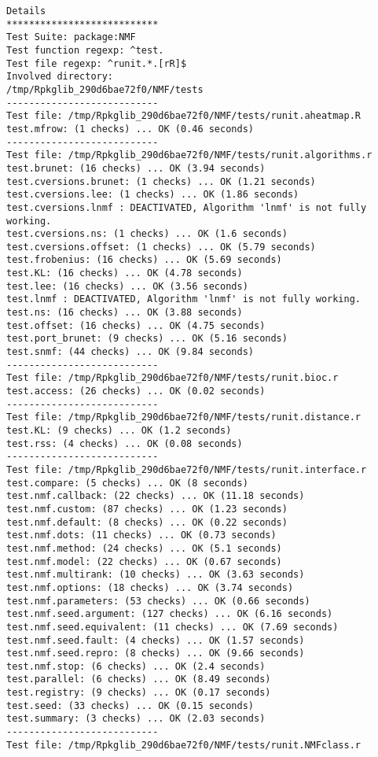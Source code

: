 \documentclass[10pt]{article}
\begin{document}
\begin{verbatim}
Details 
*************************** 
Test Suite: package:NMF 
Test function regexp: ^test. 
Test file regexp: ^runit.*.[rR]$ 
Involved directory: 
/tmp/Rpkglib_290d6bae72f0/NMF/tests 
--------------------------- 
Test file: /tmp/Rpkglib_290d6bae72f0/NMF/tests/runit.aheatmap.R 
test.mfrow: (1 checks) ... OK (0.46 seconds)
--------------------------- 
Test file: /tmp/Rpkglib_290d6bae72f0/NMF/tests/runit.algorithms.r 
test.brunet: (16 checks) ... OK (3.94 seconds)
test.cversions.brunet: (1 checks) ... OK (1.21 seconds)
test.cversions.lee: (1 checks) ... OK (1.86 seconds)
test.cversions.lnmf : DEACTIVATED, Algorithm 'lnmf' is not fully working.
test.cversions.ns: (1 checks) ... OK (1.6 seconds)
test.cversions.offset: (1 checks) ... OK (5.79 seconds)
test.frobenius: (16 checks) ... OK (5.69 seconds)
test.KL: (16 checks) ... OK (4.78 seconds)
test.lee: (16 checks) ... OK (3.56 seconds)
test.lnmf : DEACTIVATED, Algorithm 'lnmf' is not fully working.
test.ns: (16 checks) ... OK (3.88 seconds)
test.offset: (16 checks) ... OK (4.75 seconds)
test.port_brunet: (9 checks) ... OK (5.16 seconds)
test.snmf: (44 checks) ... OK (9.84 seconds)
--------------------------- 
Test file: /tmp/Rpkglib_290d6bae72f0/NMF/tests/runit.bioc.r 
test.access: (26 checks) ... OK (0.02 seconds)
--------------------------- 
Test file: /tmp/Rpkglib_290d6bae72f0/NMF/tests/runit.distance.r 
test.KL: (9 checks) ... OK (1.2 seconds)
test.rss: (4 checks) ... OK (0.08 seconds)
--------------------------- 
Test file: /tmp/Rpkglib_290d6bae72f0/NMF/tests/runit.interface.r 
test.compare: (5 checks) ... OK (8 seconds)
test.nmf.callback: (22 checks) ... OK (11.18 seconds)
test.nmf.custom: (87 checks) ... OK (1.23 seconds)
test.nmf.default: (8 checks) ... OK (0.22 seconds)
test.nmf.dots: (11 checks) ... OK (0.73 seconds)
test.nmf.method: (24 checks) ... OK (5.1 seconds)
test.nmf.model: (22 checks) ... OK (0.67 seconds)
test.nmf.multirank: (10 checks) ... OK (3.63 seconds)
test.nmf.options: (18 checks) ... OK (3.74 seconds)
test.nmf.parameters: (53 checks) ... OK (0.66 seconds)
test.nmf.seed.argument: (127 checks) ... OK (6.16 seconds)
test.nmf.seed.equivalent: (11 checks) ... OK (7.69 seconds)
test.nmf.seed.fault: (4 checks) ... OK (1.57 seconds)
test.nmf.seed.repro: (8 checks) ... OK (9.66 seconds)
test.nmf.stop: (6 checks) ... OK (2.4 seconds)
test.parallel: (6 checks) ... OK (8.49 seconds)
test.registry: (9 checks) ... OK (0.17 seconds)
test.seed: (33 checks) ... OK (0.15 seconds)
test.summary: (3 checks) ... OK (2.03 seconds)
--------------------------- 
Test file: /tmp/Rpkglib_290d6bae72f0/NMF/tests/runit.NMFclass.r 

\end{verbatim}
\end{document}
